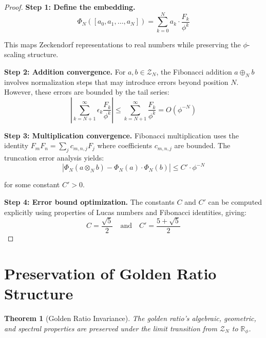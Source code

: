 \documentclass[12pt]{article}
\theoremstyle{plain}
\newtheorem{theorem}{Theorem}[section]
\theoremstyle{definition}
\begin{document}
\begin{proof}
\textbf{Step 1: Define the embedding.}
$$\Phi_N([a_0, a_1, \ldots, a_N]) = \sum_{k=0}^{N} a_k \cdot \frac{F_k}{\phi^k}$$

This maps Zeckendorf representations to real numbers while preserving the $\phi$-scaling structure.

\textbf{Step 2: Addition convergence.}
For $a, b \in \mathcal{Z}_N$, the Fibonacci addition $a \oplus_N b$ involves normalization steps that may introduce errors beyond position $N$. However, these errors are bounded by the tail series:
$$\left|\sum_{k=N+1}^{\infty} \epsilon_k \frac{F_k}{\phi^k}\right| \leq \sum_{k=N+1}^{\infty} \frac{F_k}{\phi^k} = O(\phi^{-N})$$

\textbf{Step 3: Multiplication convergence.}
Fibonacci multiplication uses the identity $F_m F_n = \sum_j c_{m,n,j} F_j$ where coefficients $c_{m,n,j}$ are bounded. The truncation error analysis yields:
$$\left|\Phi_N(a \otimes_N b) - \Phi_N(a) \cdot \Phi_N(b)\right| \leq C' \cdot \phi^{-N}$$

for some constant $C' > 0$.

\textbf{Step 4: Error bound optimization.}
The constants $C$ and $C'$ can be computed explicitly using properties of Lucas numbers and Fibonacci identities, giving:
$$C = \frac{\sqrt{5}}{2} \quad \text{and} \quad C' = \frac{5+\sqrt{5}}{2}$$
\end{proof}

\section{Preservation of Golden Ratio Structure}

\begin{theorem}[Golden Ratio Invariance]
\label{thm:phi-invariance}
The golden ratio's algebraic, geometric, and spectral properties are preserved under the limit transition from $\mathcal{Z}_N$ to $\mathbb{R}_\phi$.
\end{theorem}
\end{document}
